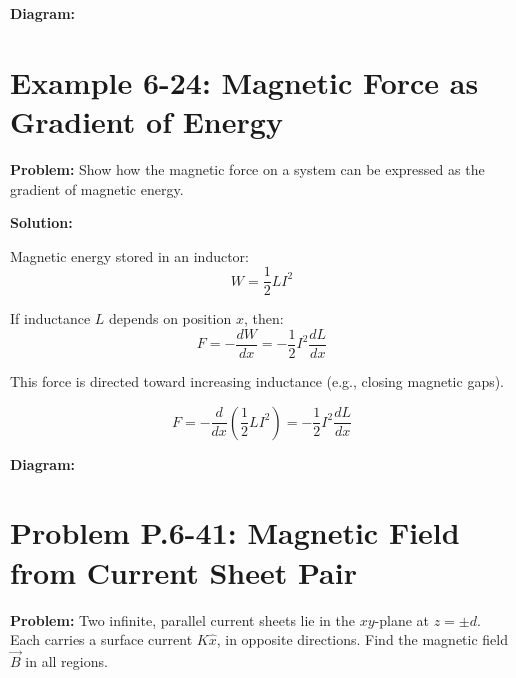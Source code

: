 \documentclass[12pt]{article}
\begin{document}
\textbf{Diagram:}
\begin{center}
\end{center}



\section*{Example 6-24: Magnetic Force as Gradient of Energy}

\textbf{Problem:}  
Show how the magnetic force on a system can be expressed as the gradient of magnetic energy.

\textbf{Solution:}

Magnetic energy stored in an inductor:
\[
W = \frac{1}{2} L I^2
\]

If inductance \( L \) depends on position \( x \), then:
\[
F = -\frac{dW}{dx} = -\frac{1}{2} I^2 \frac{dL}{dx}
\]

This force is directed toward increasing inductance (e.g., closing magnetic gaps).

\begin{tcolorbox}
\[
\boxed{F = -\frac{d}{dx} \left( \frac{1}{2} L I^2 \right) = -\frac{1}{2} I^2 \frac{dL}{dx}}
\]
\end{tcolorbox}

\textbf{Diagram:}
\begin{center}
\end{center}



\section*{Problem P.6-41: Magnetic Field from Current Sheet Pair}

\textbf{Problem:}  
Two infinite, parallel current sheets lie in the \( xy \)-plane at \( z = \pm d \). Each carries a surface current \( K \hat{x} \), in opposite directions. Find the magnetic field \( \vec{B} \) in all regions.
\end{document}
